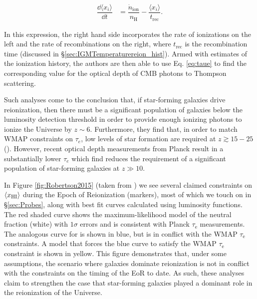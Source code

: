\begin{align}
\dfrac{\dd \langle x_{i}\rangle}{\dd t} &= \dfrac{\dot{n}_{\text{ion}}}{n_{\text{H}}} - \dfrac{\langle x_i \rangle}{t_{\text{rec}}}.
\end{align}

In this expression, the right hand side incorporates the rate of ionizations on the left and the rate of recombinations on the right, where $t_{\text{rec}}$ is the recombination time (discussed in \S \ref{sec:IGMTemperaturereion_hist}). Armed with estimates of the ionization history, the authors are then able to use Eq. \ref{eq:taue} to find the corresponding value for the optical depth of CMB photons to Thompson scattering. 
 

Such analyses come to the conclusion that, if star-forming galaxies drive reionization, then there must be a significant population of galaxies below the luminosity detection threshold in order to provide enough ionizing photons to ionize the Universe by $z \sim 6$. Furthermore, they find that, in order to match WMAP constraints on $\tau_{e}$, low levels of star formation are required at $z \gtrsim 15-25$ (\citealt{Robertson2013}). However, recent optical depth measurements from Planck result in a substantially lower $\tau_{e}$ which \citet{robertson2015cosmic} find reduces the requirement of a significant population of star-forming galaxies at $z \gg 10$. 


In Figure \ref{fig:Robertson2015} (taken from \citealt{robertson2015cosmic}) we see several claimed constraints on $\langle x_{\text{HI}}\rangle$ during the Epoch of Reionization (markers), most of which we touch on in \S \ref{sec:Probes}, along with best fit curves calculated using luminosity functions. The red shaded curve shows the maximum-likelihood model of the neutral fraction (white) with $1\sigma$ errors and is consistent with Planck $\tau_{\text{e}}$ measurements. The analogous curve for \citet{Robertson2013} is shown in blue, but is in conflict with the WMAP $\tau_{\text{e}}$ constraints. A model that forces the blue curve to satisfy the WMAP $\tau_{\text{e}}$ constraint is shown in yellow. This figure demonstrates that, under some assumptions, the scenario where galaxies dominate reionization is not in conflict with the constraints on the timing of the EoR to date. As such, these analyses claim to strengthen the case that star-forming galaxies played a dominant role in the reionization of the Universe. 


